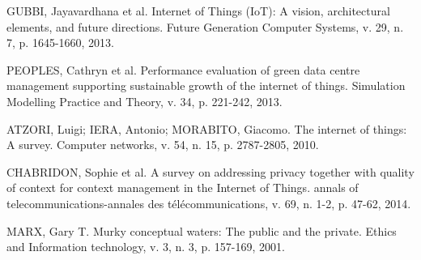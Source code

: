 GUBBI, Jayavardhana et al. Internet of Things (IoT): A vision, architectural elements, and future directions.
Future Generation Computer Systems, v. 29, n. 7, p. 1645-1660, 2013.

PEOPLES, Cathryn et al. Performance evaluation of green data centre management supporting sustainable
growth of the internet of things. Simulation Modelling Practice and Theory, v. 34, p. 221-242, 2013.

ATZORI, Luigi; IERA, Antonio; MORABITO, Giacomo. The internet of things: A survey. Computer
networks, v. 54, n. 15, p. 2787-2805, 2010.

CHABRIDON, Sophie et al. A survey on addressing privacy together with quality of context for context
management in the Internet of Things. annals of telecommunications-annales des télécommunications, v. 69,
n. 1-2, p. 47-62, 2014.

MARX, Gary T. Murky conceptual waters: The public and the private. Ethics and Information technology, v.
3, n. 3, p. 157-169, 2001.